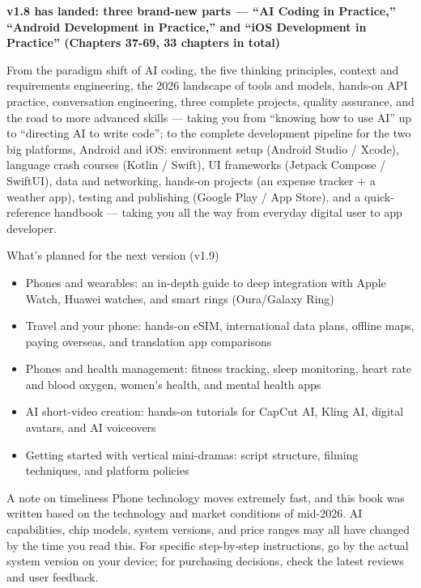 

\textbf{v1.8 has landed: three brand-new parts — “AI Coding in Practice,” “Android Development in Practice,” and “iOS Development in Practice” (Chapters 37-69, 33 chapters in total)}\par

From the paradigm shift of AI coding, the five thinking principles, context and requirements engineering, the 2026 landscape of tools and models, hands-on API practice, conversation engineering, three complete projects, quality assurance, and the road to more advanced skills — taking you from “knowing how to use AI” up to “directing AI to write code”; to the complete development pipeline for the two big platforms, Android and iOS: environment setup (Android Studio / Xcode), language crash courses (Kotlin / Swift), UI frameworks (Jetpack Compose / SwiftUI), data and networking, hands-on projects (an expense tracker + a weather app), testing and publishing (Google Play / App Store), and a quick-reference handbook — taking you all the way from everyday digital user to app developer.

\begin{tcbinfo}{What's planned for the next version (v1.9)}
\begin{itemize}
  \item Phones and wearables: an in-depth guide to deep integration with Apple Watch, Huawei watches, and smart rings (Oura/Galaxy Ring)
  \item Travel and your phone: hands-on eSIM, international data plans, offline maps, paying overseas, and translation app comparisons
  \item Phones and health management: fitness tracking, sleep monitoring, heart rate and blood oxygen, women's health, and mental health apps
  \item AI short-video creation: hands-on tutorials for CapCut AI, Kling AI, digital avatars, and AI voiceovers
  \item Getting started with vertical mini-dramas: script structure, filming techniques, and platform policies
\end{itemize}

\end{tcbinfo}

\begin{tcbwarn}{A note on timeliness}
Phone technology moves extremely fast, and this book was written based on the technology and market conditions of mid-2026. AI capabilities, chip models, system versions, and price ranges may all have changed by the time you read this. For specific step-by-step instructions, go by the actual system version on your device; for purchasing decisions, check the latest reviews and user feedback.

\end{tcbwarn}
